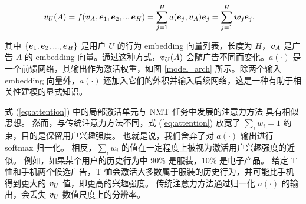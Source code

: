 {
\begin{small}
\begin{equation}
\begin{split}
\label{eq:attention}
\boldsymbol{v}_U(A) = f(\boldsymbol{v}_A,\boldsymbol{e}_1,\boldsymbol{e}_2,..,\boldsymbol{e}_H) & = \sum_{j=1}^H a(\boldsymbol{e}_j,\boldsymbol{v}_A) \boldsymbol{e}_j = \sum_{j=1}^H \boldsymbol{w}_j \boldsymbol{e}_j,
\end{split}
\end{equation}
\end{small}
}
其中 $\{\boldsymbol{e}_1, \boldsymbol{e}_2, ..., \boldsymbol{e}_H\}$ 是用户 $U$ 的行为 embedding 向量列表，长度为 $H$，$\boldsymbol{v}_A$ 是广告 $A$ 的 embedding 向量。通过这种方式，$\boldsymbol{v}_U(A)$ 会随广告不同而变化。$a(\cdot)$ 是一个前馈网络，其输出作为激活权重，如图 \ref{model_arch} 所示。除两个输入 embedding 向量外，$a(\cdot)$ 还加入它们的外积并输入后续网络，这是一种有助于相关性建模的显式知识。

式 (\ref{eq:attention}) 中的局部激活单元与 NMT 任务中发展的注意力方法 \cite{bengio:attention} 具有相似思想。
然而，与传统注意力方法不同，式 (\ref{eq:attention}) 放宽了 $\sum_i w_i = 1$ 约束，目的是保留用户兴趣强度。
也就是说，我们舍弃了对 $a(\cdot)$ 输出进行 softmax 归一化。
相反，$\sum_i w_i$ 的值在一定程度上被视为激活用户兴趣强度的近似。
例如，如果某个用户的历史行为中 90\% 是服装，10\% 是电子产品。
给定 T 恤和手机两个候选广告，T 恤会激活大多数属于服装的历史行为，并可能比手机得到更大的 $\boldsymbol{v}_U$ 值，即更高的兴趣强度。
传统注意力方法通过归一化 $a(\cdot)$ 的输出，会丢失 $\boldsymbol{v}_U$ 数值尺度上的分辨率。



